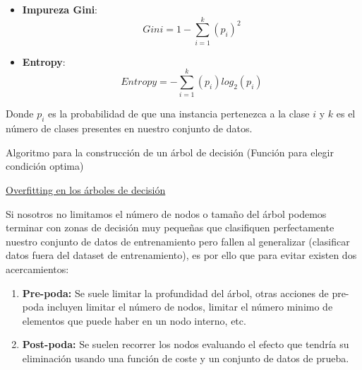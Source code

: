 \documentclass[11pt,fleqn]{book} %
\begin{document}
\begin{itemize}
\item \textbf{Impureza Gini}: 
\begin{equation}
Gini = 1 - \sum_{i=1}^{k}(p_i)^{2}
\end{equation}
\item \textbf{Entropy}: 
\begin{equation}
Entropy = - \sum_{i=1}^{k}(p_i)log_2(p_i)
\end{equation}
\end{itemize}
Donde $p_i$ es la probabilidad de que una instancia pertenezca a la clase $i$ y $k$ es el número de clases presentes en nuestro conjunto de datos.
\begin{algorithm}
  \DontPrintSemicolon
  
  \;

  \caption{Algoritmo para la construcción de un árbol de decisión (Función para elegir condición optima)}
\end{algorithm}
\FloatBarrier


\underline{Overfitting en los árboles de decisión}

Si nosotros no limitamos el número de nodos o tamaño del árbol podemos terminar con zonas de decisión muy pequeñas que clasifiquen perfectamente nuestro conjunto de datos de entrenamiento pero fallen al generalizar (clasificar datos fuera del dataset de entrenamiento), es por ello que para evitar existen dos acercamientos:

\begin{enumerate}
\item \textbf{Pre-poda:} Se suele limitar la profundidad del árbol, otras acciones de pre-poda incluyen limitar el número de nodos, limitar el número minimo de elementos que puede haber en un nodo interno, etc.
\item \textbf{Post-poda:} Se suelen recorrer los nodos evaluando el efecto que tendría su eliminación usando una función de coste y un conjunto de datos de prueba.

\end{enumerate}
\end{document}
